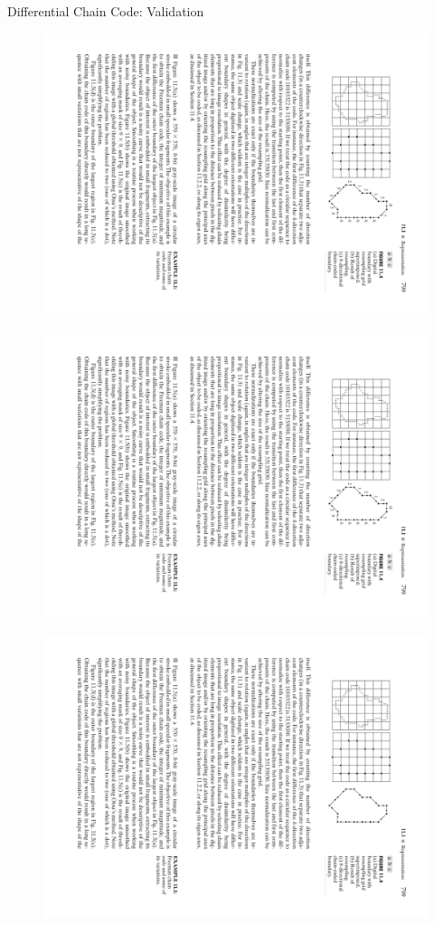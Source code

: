 \begin{frame}{Differential Chain Code: Validation}
\begin{figure}
\includegraphics[scale=0.9]{Figures/Feature02a}~~~
\includegraphics[scale=0.9]{Figures/Feature02b}~~~
\includegraphics[scale=0.9]{Figures/Feature02c1}

\end{figure}
\end{frame}

